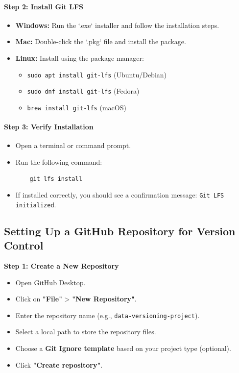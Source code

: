 \paragraph{Step 2: Install Git LFS}
\begin{itemize}
    \item \textbf{Windows:} Run the `.exe` installer and follow the installation steps.
    \item \textbf{Mac:} Double-click the `.pkg` file and install the package.
    \item \textbf{Linux:} Install using the package manager:
    \begin{itemize}
        \item \texttt{sudo apt install git-lfs} (Ubuntu/Debian)
        \item \texttt{sudo dnf install git-lfs} (Fedora)
        \item \texttt{brew install git-lfs} (macOS)
    \end{itemize}
\end{itemize}

\paragraph{Step 3: Verify Installation}
\begin{itemize}
    \item Open a terminal or command prompt.
    \item Run the following command:
    \begin{verbatim}
    git lfs install
    \end{verbatim}
    \item If installed correctly, you should see a confirmation message: \texttt{Git LFS initialized}.
\end{itemize}

\subsection{Setting Up a GitHub Repository for Version Control}
\textbf{Step 1: Create a New Repository}
\begin{itemize}
    \item Open GitHub Desktop.
    \item Click on \textbf{"File"} > \textbf{"New Repository"}.
    \item Enter the repository name (e.g., \texttt{data-versioning-project}).
    \item Select a local path to store the repository files.
    \item Choose a \textbf{Git Ignore template} based on your project type (optional).
    \item Click \textbf{"Create repository"}.
\end{itemize}

